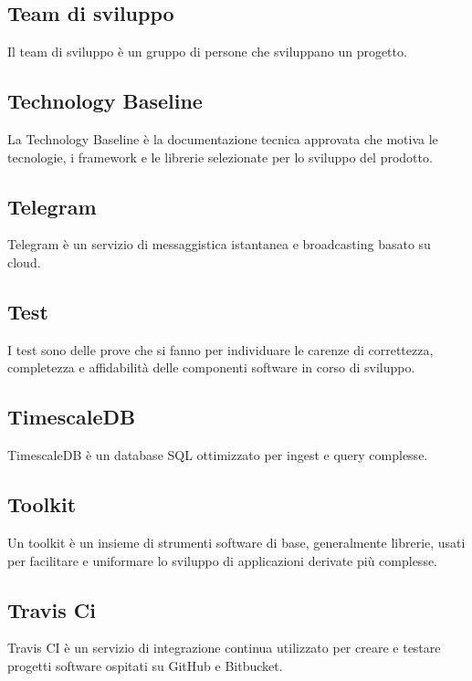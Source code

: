 
\subsection*{Team di sviluppo}
Il team di sviluppo è un gruppo di persone che sviluppano un progetto.

\subsection*{Technology Baseline}
La Technology Baseline è la documentazione tecnica approvata che motiva le tecnologie, i framework e le librerie selezionate per lo sviluppo del prodotto.

\subsection*{Telegram}
Telegram è un servizio di messaggistica istantanea e broadcasting basato su cloud.

\subsection*{Test}
I test sono delle prove che si fanno per individuare le carenze di correttezza, completezza e affidabilità delle componenti software in corso di sviluppo.

\subsection*{TimescaleDB}
TimescaleDB è un database SQL ottimizzato per ingest e query complesse.

\subsection*{Toolkit}
Un toolkit è un insieme di strumenti software di base, generalmente librerie, usati per facilitare e uniformare lo sviluppo di applicazioni derivate più complesse.

\subsection*{Travis Ci}
Travis CI è un servizio di integrazione continua utilizzato per creare e testare progetti software ospitati su GitHub e Bitbucket.

